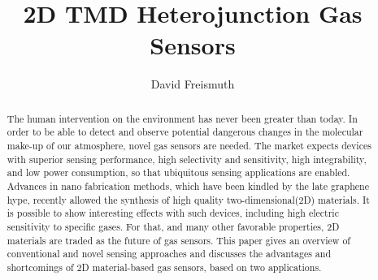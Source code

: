 \documentclass{article}
\begin{document}
\title{2D TMD Heterojunction Gas Sensors}
\author{David Freismuth}

\maketitle

\begin{abstract}
The human intervention on the environment has never been greater than today. In order to be able to detect and observe potential dangerous changes in the molecular make-up of our atmosphere, novel gas sensors are needed. The market expects devices with superior sensing performance, high selectivity and sensitivity, high integrability, and low power consumption, so that ubiquitous sensing applications are enabled. Advances in nano fabrication methods, which have been kindled by the late graphene hype, recently allowed the synthesis of high quality two-dimensional(2D) materials. It is possible to show interesting effects with such devices, including high electric sensitivity to specific gases. For that, and many other favorable properties, 2D materials are traded as the future of gas sensors. This paper gives an overview of conventional and novel sensing approaches and discusses the advantages and shortcomings of 2D material-based gas sensors, based on two applications. 
\end{abstract}









\printglossaries
\end{document}
